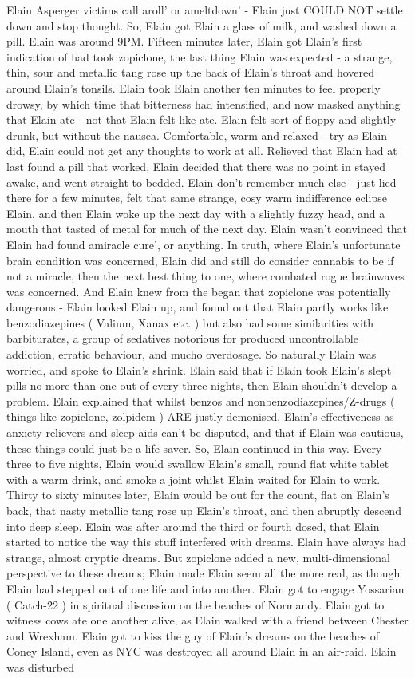 \documentclass[12pt]{book}
\begin{document}
Elain Asperger victims call aroll' or ameltdown' - Elain just COULD NOT settle down and stop thought. So, Elain got Elain a glass of milk, and washed down a pill. Elain was around 9PM. Fifteen minutes later, Elain got Elain's first indication of had took zopiclone, the last thing Elain was expected - a strange, thin, sour and metallic tang rose up the back of Elain's throat and hovered around Elain's tonsils. Elain took Elain another ten minutes to feel properly drowsy, by which time that bitterness had intensified, and now masked anything that Elain ate - not that Elain felt like ate. Elain felt sort of floppy and slightly drunk, but without the nausea. Comfortable, warm and relaxed - try as Elain did, Elain could not get any thoughts to work at all. Relieved that Elain had at last found a pill that worked, Elain decided that there was no point in stayed awake, and went straight to bedded. Elain don't remember much else - just lied there for a few minutes, felt that same strange, cosy warm indifference eclipse Elain, and then Elain woke up the next day with a slightly fuzzy head, and a mouth that tasted of metal for much of the next day. Elain wasn't convinced that Elain had found amiracle cure', or anything. In truth, where Elain's unfortunate brain condition was concerned, Elain did and still do consider cannabis to be if not a miracle, then the next best thing to one, where combated rogue brainwaves was concerned. And Elain knew from the began that zopiclone was potentially dangerous - Elain looked Elain up, and found out that Elain partly works like benzodiazepines ( Valium, Xanax etc. ) but also had some similarities with barbiturates, a group of sedatives notorious for produced uncontrollable addiction, erratic behaviour, and mucho overdosage. So naturally Elain was worried, and spoke to Elain's shrink. Elain said that if Elain took Elain's slept pills no more than one out of every three nights, then Elain shouldn't develop a problem. Elain explained that whilst benzos and nonbenzodiazepines/Z-drugs ( things like zopiclone, zolpidem ) ARE justly demonised, Elain's effectiveness as anxiety-relievers and sleep-aids can't be disputed, and that if Elain was cautious, these things could just be a life-saver. So, Elain continued in this way. Every three to five nights, Elain would swallow Elain's small, round flat white tablet with a warm drink, and smoke a joint whilst Elain waited for Elain to work. Thirty to sixty minutes later, Elain would be out for the count, flat on Elain's back, that nasty metallic tang rose up Elain's throat, and then abruptly descend into deep sleep. Elain was after around the third or fourth dosed, that Elain started to notice the way this stuff interfered with dreams. Elain have always had strange, almost cryptic dreams. But zopiclone added a new, multi-dimensional perspective to these dreams; Elain made Elain seem all the more real, as though Elain had stepped out of one life and into another. Elain got to engage Yossarian ( Catch-22 ) in spiritual discussion on the beaches of Normandy. Elain got to witness cows ate one another alive, as Elain walked with a friend between Chester and Wrexham. Elain got to kiss the guy of Elain's dreams on the beaches of Coney Island, even as NYC was destroyed all around Elain in an air-raid. Elain was disturbed 
\end{document}
